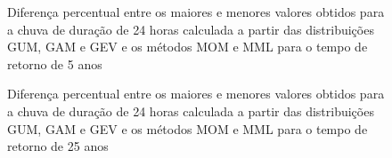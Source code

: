 \documentclass[
]{agujournal2019}
\begin{document}
\begin{figure}


\caption{\label{fig-Figura17}Diferença percentual entre os maiores e
menores valores obtidos para a chuva de duração de 24 horas calculada a
partir das distribuições GUM, GAM e GEV e os métodos MOM e MML para o
tempo de retorno de 5 anos}

\end{figure}%

\begin{figure}


\caption{\label{fig-Figura18}Diferença percentual entre os maiores e
menores valores obtidos para a chuva de duração de 24 horas calculada a
partir das distribuições GUM, GAM e GEV e os métodos MOM e MML para o
tempo de retorno de 25 anos}

\end{figure}%
\end{document}
